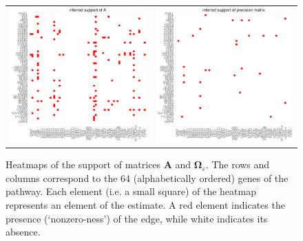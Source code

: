 \documentclass[a4paper]{article}
\begin{document}
\begin{figure}[h!]
\centering
\begin{tabular}{cc}
\includegraphics[scale=0.3]{Ahat_support.eps}
&
\includegraphics[scale=0.3]{Phat_support.eps}
\end{tabular}
\caption{Heatmaps of the support of matrices $\mathbf{A}$ and $\mathbf{\Omega}_{\varepsilon}$. The rows and columns correspond to the 64 (alphabetically ordered) genes of the pathway. Each element (i.e. a small square) of the heatmap represents an element of the estimate. A red element indicates the presence (`nonzero-ness') of the edge, while white indicates its absence.
}
\label{figSM:support}
\end{figure}
\end{document}
